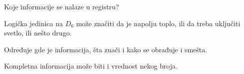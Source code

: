 \begin{frame}[label=04-s024]{Koje informacije se nalaze u registru?}
\par
{\fontsize{10}{12}\selectfont\renewcommand{\arraystretch}{.95}\par}\par\vspace{2mm}
Logička jedinica na $D_6$ može značiti da je napolju toplo, ili da treba uključiti svetlo, ili nešto drugo.\par\vspace{2mm}
Određuje gde je informacija, šta znači i kako se obrađuje i smešta.\par\vspace{2mm}
Kompletna informacija može biti i vrednost nekog broja.
\end{frame}
